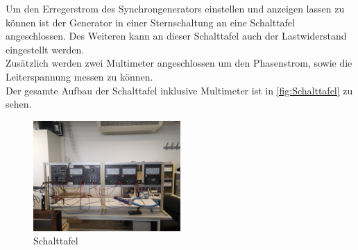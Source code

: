 Um den Erregerstrom des Synchrongenerators einstellen und anzeigen lassen zu können ist der Generator in einer Sternschaltung an eine Schalttafel angeschlossen.
Des Weiteren kann an dieser Schalttafel auch der Lastwiderstand eingestellt werden.\\
Zusätzlich werden zwei Multimeter angeschlossen um den Phasenstrom, sowie die Leiterspannung messen zu können.\\
Der gesamte Aufbau der Schalttafel inklusive Multimeter ist in \autoref{fig:Schalttafel} zu sehen.

\begin{figure}[!ht]
    \centering
    \includegraphics[width=0.5\textwidth]{Abbildungen/Schalttafel.jpeg}
    \caption{Schalttafel}
    \label{fig:Schalttafel}
\end{figure}